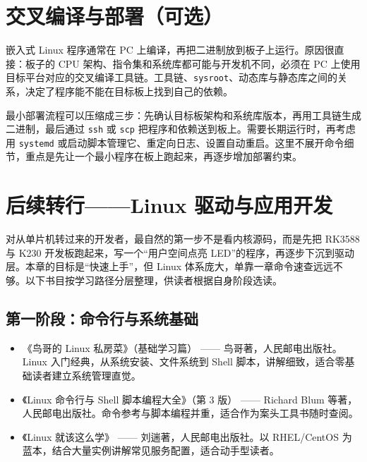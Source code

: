 \section{交叉编译与部署（可选）}

嵌入式 Linux 程序通常在 PC 上编译，再把二进制放到板子上运行。原因很直接：板子的 CPU 架构、指令集和系统库都可能与开发机不同，必须在 PC 上使用目标平台对应的交叉编译工具链。工具链、\texttt{sysroot}、动态库与静态库之间的关系，决定了程序能不能在目标板上找到自己的依赖。

最小部署流程可以压缩成三步：先确认目标板架构和系统库版本，再用工具链生成二进制，最后通过 \texttt{ssh} 或 \texttt{scp} 把程序和依赖送到板上。需要长期运行时，再考虑用 \texttt{systemd} 或启动脚本管理它、重定向日志、设置自动重启。这里不展开命令细节，重点是先让一个最小程序在板上跑起来，再逐步增加部署约束。

\section{后续转行——Linux 驱动与应用开发}

对从单片机转过来的开发者，最自然的第一步不是看内核源码，而是先把 RK3588 与 K230 开发板跑起来，写一个“用户空间点亮 LED”的程序，再逐步下沉到驱动层。本章的目标是“快速上手”，但 Linux 体系庞大，单靠一章命令速查远远不够。以下书目按学习路径分层整理，供读者根据自身阶段选读。

\subsection*{第一阶段：命令行与系统基础}
\begin{itemize}
	\item 《鸟哥的 Linux 私房菜》（基础学习篇） —— 鸟哥著，人民邮电出版社。Linux 入门经典，从系统安装、文件系统到 Shell 脚本，讲解细致，适合零基础读者建立系统管理直觉。
	\item 《Linux 命令行与 Shell 脚本编程大全》（第 3 版） —— Richard Blum 等著，人民邮电出版社。命令参考与脚本编程并重，适合作为案头工具书随时查阅。
	\item 《Linux 就该这么学》 —— 刘遄著，人民邮电出版社。以 RHEL/CentOS 为蓝本，结合大量实例讲解常见服务配置，适合动手型读者。
\end{itemize}

